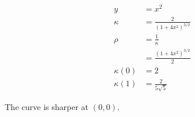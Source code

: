 \documentclass{article}
\begin{document}
\setcounter{subsubsection}{22}
\subsubsection{}

\begin{align*}
  y         & = x^2                           \\
  \kappa    & = \frac{2}{(1 + 4 x^2)^{3 / 2}} \\
  \rho      & = \frac{1}{\kappa}              \\
            & = \frac{(1 + 4 x^2)^{3 / 2}}{2} \\
  \kappa(0) & = 2                             \\
  \kappa(1) & = \frac{2}{5 \sqrt{5}}
\end{align*}

The curve is sharper at $(0, 0)$.
\end{document}
